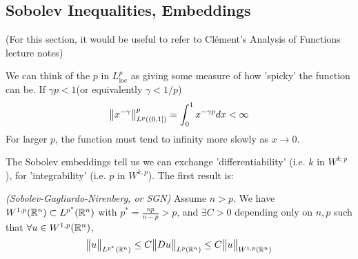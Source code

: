 \documentclass[12pt,a4paper]{report}
\begin{document}
\subsection*{Sobolev Inequalities, Embeddings}

(For this section, it would be useful to refer to Cl\'{e}ment's Analysis of Functions lecture notes)
\s

We can think of the $p$ in $L^p_{\text{loc}}$ as giving some measure of how 'spicky' the function can be. If $\gamma p <1$(or equivalently $\gamma <1/p$)
\begin{align*}
\bigl\lVert x^{-\gamma}\bigr\rVert_{L^p((0,1])}^p = \int_0^1 x^{-\gamma p} dx < \infty
\end{align*}
For larger $p$, the function must tend to infinity more slowly as $x\rightarrow 0$.
\s

The Sobolev embeddings tell us we can exchange 'differentiability' (i.e. $k$ in $W^{k,p}$), for 'integrability' (i.e. $p$ in $W^{k,p}$). The first result is:
\s

\thm \emph{(Sobolev-Gagliardo-Nirenberg, or SGN)} Assume $n>p$. We have $W^{1,p}(\mathbb{R}^n) \subset L^{p^*} (\mathbb{R}^n)$ with $p^* = \frac{np}{n-p}>p$, and $\exists C >0$ depending only on $n,p$ such that $\forall u \in W^{1,p}(\mathbb{R}^n)$,
\begin{align*}
\bigl\lVert u\bigr\rVert_{L^{p^*}(\mathbb{R}^n)} \leq C \bigl\lVert Du\bigr\rVert_{L^p(\mathbb{R}^n)} \leq C\bigl\lVert u\bigr\rVert_{W^{1,p}(\mathbb{R}^n)}
\end{align*}
\s
\end{document}
